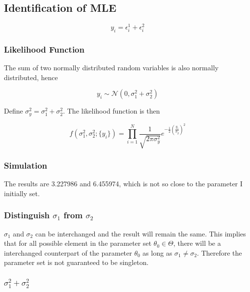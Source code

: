 \subsection{Identification of MLE}

\begin{equation*}
    y_i = \epsilon_i^1 + \epsilon_i^2
\end{equation*}

\subsubsection{Likelihood Function}

The sum of two normally distributed random variables is also normally distributed, hence

\begin{equation}
    y_i \sim \mathcal{N}(0, \sigma_1^2 + \sigma_2^2)
\end{equation}

Define $\sigma_y^2 = \sigma_1^2 + \sigma_2^2$. The likelihood function is then 

\begin{equation}
    f(\sigma_1^2, \sigma_2^2 ; \{y_i\}) = 
    \prod_{i=1}^N 
    \frac{1}{\sqrt{2\pi \sigma_y^2}} 
    e^{-\frac{1}{2} \left( \frac{y_i}{\sigma_y}\right)^2}
\end{equation}



\subsubsection{Simulation}



The results are 3.227986 and 6.455974, which is not so close to the parameter I initially set.


\subsubsection{Distinguish $\sigma_1$ from $\sigma_2$}

$\sigma_1$ and $\sigma_2$ can be interchanged and the result will remain the same. This implies that for all possible element in the parameter set $\theta_0 \in \Theta$, there will be a interchanged counterpart of the parameter $\theta_0$ as long as $\sigma_1 \ne \sigma_2$. Therefore the parameter set is not guaranteed to be singleton.

\subsubsection{$\sigma_1^2 + \sigma_2^2 $}

